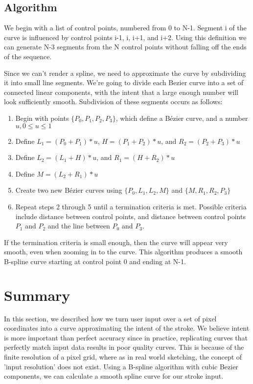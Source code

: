 \subsection{Algorithm}

We begin with a list of control points, numbered from 0 to N-1. 
Segment i of the curve is influenced by control points i-1, i, i+1, and i+2.
Using this definition we can generate N-3 segments from the N control points without falling off the ends of the sequence.

Since we can't render a spline, we need to approximate the curve by subdividing it into small line segments.
We're going to divide each Bezier curve into a set of connected linear components, with the intent that a large enough number will look sufficiently smooth.
Subdivision of these segments occurs as follows:
\begin{enumerate}
\item Begin with points $\{P_0,P_1,P_2,P_3\}$, which define a Bézier curve, and a number $u, 0 \le u \le 1$
\item Define $L_1=(P_0 + P_1)*u$, $H=(P_1 + P_2)*u$, and $R_2=(P_2 + P_3)*u$
\item Define $L_2=(L_1 + H)*u$, and $R_1=(H + R_2)*u$
\item Define $M=(L_2 + R_1)*u$
\item Create two new Bézier curves using $\{P_0,L_1,L_2,M\}$ and $\{M,R_1,R_2,P_3\}$
\item Repeat steps 2 through 5 until a termination criteria is met. Possible criteria include distance between control points, and distance between control points $P_1$ and $P_2$ and the line between $P_0$ and $P_3$.
\end{enumerate}
If the termination criteria is small enough, then the curve will appear very smooth, even when zooming in to the curve.
This algorithm produces a smooth B-spline curve starting at control point 0 and ending at N-1.

\section{Summary}
In this section, we described how we turn user input over a set of pixel coordinates into a curve approximating the intent of the stroke.
We believe intent is more important than perfect accuracy since in practice, replicating curves that perfectly match input data results in poor quality curves.
This is because of the finite resolution of a pixel grid, where as in real world sketching, the concept of 'input resolution' does not exist.
Using a B-spline algorithm with cubic Bezier components, we can calculate a smooth spline curve for our stroke input.